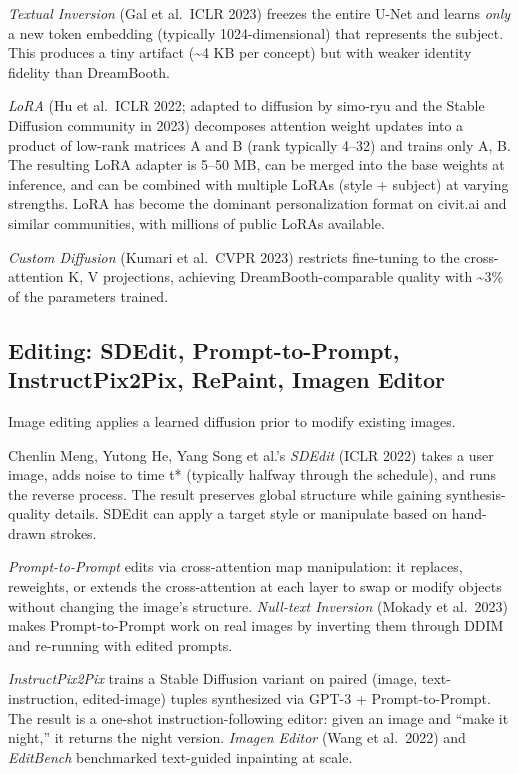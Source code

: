 \documentclass{article}
\begin{document}
\emph{Textual Inversion} (Gal et al.~ICLR 2023) freezes the entire U-Net and learns \emph{only} a new token embedding (typically 1024-dimensional) that represents the subject. This produces a tiny artifact (\textasciitilde4 KB per concept) but with weaker identity fidelity than DreamBooth.

\emph{LoRA} (Hu et al.~ICLR 2022; adapted to diffusion by simo-ryu and the Stable Diffusion community in 2023) decomposes attention weight updates into a product of low-rank matrices A and B (rank typically 4--32) and trains only A, B. The resulting LoRA adapter is 5--50 MB, can be merged into the base weights at inference, and can be combined with multiple LoRAs (style + subject) at varying strengths. LoRA has become the dominant personalization format on civit.ai and similar communities, with millions of public LoRAs available.

\emph{Custom Diffusion} (Kumari et al.~CVPR 2023) restricts fine-tuning to the cross-attention K, V projections, achieving DreamBooth-comparable quality with \textasciitilde3\% of the parameters trained.

\subsection{Editing: SDEdit, Prompt-to-Prompt, InstructPix2Pix, RePaint, Imagen Editor}\label{editing-sdedit-prompt-to-prompt-instructpix2pix-repaint-imagen-editor}

Image editing applies a learned diffusion prior to modify existing images.

Chenlin Meng, Yutong He, Yang Song et al.'s \emph{SDEdit} (ICLR 2022) takes a user image, adds noise to time t* (typically halfway through the schedule), and runs the reverse process. The result preserves global structure while gaining synthesis-quality details. SDEdit can apply a target style or manipulate based on hand-drawn strokes.

\emph{Prompt-to-Prompt} \citep{hertz2023prompttopromptimag} edits via cross-attention map manipulation: it replaces, reweights, or extends the cross-attention at each layer to swap or modify objects without changing the image's structure. \emph{Null-text Inversion} (Mokady et al.~2023) makes Prompt-to-Prompt work on real images by inverting them through DDIM and re-running with edited prompts.

\emph{InstructPix2Pix} \citep{brooks2023instructpix2pixlea} trains a Stable Diffusion variant on paired (image, text-instruction, edited-image) tuples synthesized via GPT-3 + Prompt-to-Prompt. The result is a one-shot instruction-following editor: given an image and ``make it night,'' it returns the night version. \emph{Imagen Editor} (Wang et al.~2022) and \emph{EditBench} benchmarked text-guided inpainting at scale.
\end{document}
